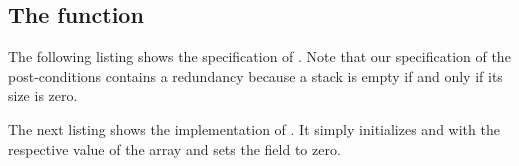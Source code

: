 
\subsection{The function \stackinit}

The following listing shows the specification of \stackinit.
Note that our specification of the post-conditions contains a redundancy
because a stack is empty if and only if its size is zero.



The next listing shows the implementation of \stackinit.
It simply initializes  and  with the respective
value of the array and sets the field  to zero.



